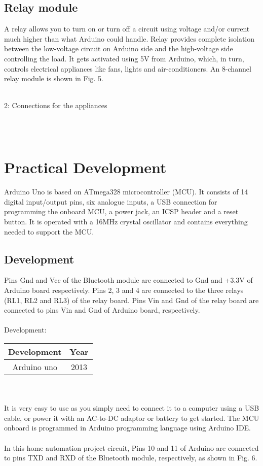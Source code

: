 \documentclass[10pt]{article}
\begin{document}
	\subsection{Relay module}
A relay allows you to turn on or turn off a circuit using voltage and/or current much higher than what Arduino could handle. Relay provides complete isolation between the low-voltage circuit on Arduino side and the high-voltage side controlling the load. It gets activated using 5V from Arduino, which, in turn, controls electrical appliances like fans, lights and air-conditioners. An 8-channel relay module is shown in Fig. 5.\\[0.5 cm]\\
	\begin{minipage}{0.3\textwidth}	
	\figurename{2: Connections for the appliances}
\end{minipage}\\[0.3 cm]\\
	\cleardoublepage
		\section{Practical Development}\label{sec:PD}
Arduino Uno is based on ATmega328 microcontroller (MCU). It consists of 14 digital input/output pins, six analogue inputs, a USB connection for programming the onboard MCU, a power jack, an ICSP header and a reset button. It is operated with a 16MHz crystal oscillator and contains everything needed to support the MCU.
	\subsection{Development}
Pins Gnd and Vcc of the Bluetooth module are connected to Gnd and +3.3V of Arduino board respectively. Pins 2, 3 and 4 are connected to the three relays (RL1, RL2 and RL3) of the relay board. Pins Vin and Gnd of the relay board are connected to pins Vin and Gnd of Arduino board, respectively.\\[0.3 cm]\\
Development:\\
\begin{tabular}{|c|c|}
	\hline
	\large	Development &\large Year \\ \hline
	Arduino uno &2013\\ \hline
\end{tabular}\\[0.3 cm]\\ It is very easy to use as you simply need to connect it to a computer using a USB cable, or power it with an AC-to-DC adaptor or battery to get started. The MCU onboard is programmed in Arduino programming language using Arduino IDE.\\[0.5 cm]\\In this home automation project circuit, Pins 10 and 11 of Arduino are connected to pins TXD and RXD of the Bluetooth module, respectively, as shown in Fig. 6.\\[0.3 cm]\\
\end{document}
